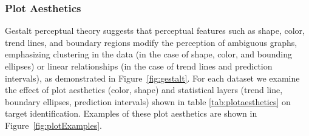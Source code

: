 \documentclass[12pt]{article}\usepackage[]{graphicx}\usepackage[]{color}
\begin{document}
\subsubsection{Plot Aesthetics}
Gestalt perceptual theory suggests that perceptual features such as shape, color, trend lines, and boundary regions modify the perception of ambiguous graphs, emphasizing clustering in the data (in the case of shape, color, and bounding ellipses) or linear relationships (in the case of trend lines and prediction intervals), as demonstrated in Figure~\ref{fig:gestalt}. For each dataset we examine the effect of plot aesthetics (color, shape) and statistical layers (trend line, boundary ellipses, prediction intervals) shown in table \ref{tab:plotaesthetics}  on target identification. Examples of these plot aesthetics are shown in Figure~\ref{fig:plotExamples}.
\end{document}
